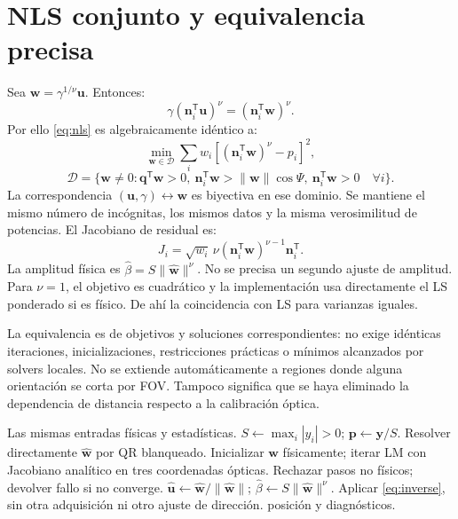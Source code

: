 \documentclass[11pt,a4paper]{article}
\begin{document}
\section{NLS conjunto y equivalencia precisa}
Sea $\mathbf w=\gamma^{1/\nu}\mathbf u$. Entonces:
\begin{equation}
 \gamma(\mathbf n_i^{\mathsf T}\mathbf u)^\nu=(\mathbf n_i^{\mathsf T}\mathbf w)^\nu.
\end{equation}
Por ello \eqref{eq:nls} es algebraicamente idéntico a:
\begin{equation}
 \min_{\mathbf w\in\mathcal D}\sum_iw_i[(\mathbf n_i^{\mathsf T}\mathbf w)^\nu-p_i]^2,
\end{equation}
\begin{equation}
 \mathcal D=\{\mathbf w\ne0:\mathbf q^{\mathsf T}\mathbf w>0,
 \ \mathbf n_i^{\mathsf T}\mathbf w>\|\mathbf w\|\cos\Psi,\ \mathbf n_i^{\mathsf T}\mathbf w>0\quad\forall i\}.
\end{equation}
La correspondencia $(\mathbf u,\gamma)\leftrightarrow\mathbf w$ es biyectiva en ese dominio. Se mantiene el mismo número de incógnitas, los mismos datos y la misma verosimilitud de potencias. El Jacobiano de residual es:
\begin{equation}
 J_i=\sqrt{w_i}\,\nu(\mathbf n_i^{\mathsf T}\mathbf w)^{\nu-1}\mathbf n_i^{\mathsf T}.
\end{equation}
La amplitud física es $\hat\beta=S\|\hat{\mathbf w}\|^\nu$. No se precisa un segundo ajuste de amplitud. Para $\nu=1$, el objetivo es cuadrático y la implementación usa directamente el LS ponderado si es físico. De ahí la coincidencia con LS para varianzas iguales.

La equivalencia es de objetivos y soluciones correspondientes: no exige idénticas iteraciones, inicializaciones, restricciones prácticas o mínimos alcanzados por solvers locales. No se extiende automáticamente a regiones donde alguna orientación se corta por FOV. Tampoco significa que se haya eliminado la dependencia de distancia respecto a la calibración óptica.

\begin{algorithm}[htbp]\caption{NLS conjunto en coordenadas ópticas}\begin{algorithmic}[1]
\Require Las mismas entradas físicas y estadísticas.
\State $S\gets\max_i|y_i|>0$; $\mathbf p\gets\mathbf y/S$.
\State Resolver directamente $\hat{\mathbf w}$ por QR blanqueado.
\Else
\State Inicializar $\mathbf w$ físicamente; iterar LM con Jacobiano analítico en tres coordenadas ópticas.
\State Rechazar pasos no físicos; devolver fallo si no converge.
\EndIf
\State $\hat{\mathbf u}\gets\hat{\mathbf w}/\|\hat{\mathbf w}\|$; $\hat\beta\gets S\|\hat{\mathbf w}\|^\nu$.
\State Aplicar \eqref{eq:inverse}, sin otra adquisición ni otro ajuste de dirección.
\State \Return posición y diagnósticos.
\end{algorithmic}\end{algorithm}
\end{document}
